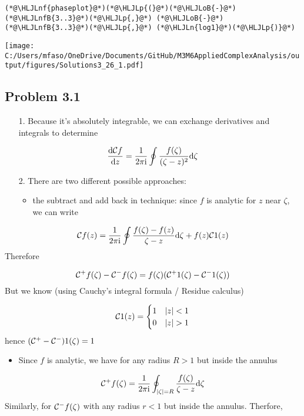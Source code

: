 \documentclass[12pt,landscape]{article}
\newcommand{\HLJLn}[1]{#1}
\newcommand{\HLJLnf}[1]{\textcolor[RGB]{66,102,213}{#1}}
\newcommand{\HLJLnfB}[1]{\textcolor[RGB]{59,151,46}{#1}}
\newcommand{\HLJLoB}[1]{\textcolor[RGB]{102,102,102}{\textbf{#1}}}
\newcommand{\HLJLp}[1]{#1}
\def\D{ {\rm d} }
\def\I{ {\rm i} }
\def\CC{ {\cal C} }
\begin{document}
{\begin{lstlisting}
(*@\HLJLnf{phaseplot}@*)(*@\HLJLp{(}@*)(*@\HLJLoB{-}@*)(*@\HLJLnfB{3..3}@*)(*@\HLJLp{,}@*) (*@\HLJLoB{-}@*)(*@\HLJLnfB{3..3}@*)(*@\HLJLp{,}@*) (*@\HLJLn{log1}@*)(*@\HLJLp{)}@*)
\end{lstlisting}

\texttt{[image: C:/Users/mfaso/OneDrive/Documents/GitHub/M3M6AppliedComplexAnalysis/output/figures/Solutions3\_26\_1.pdf]}

\subsection{Problem 3.1}
\begin{itemize}
\item[1. ] Because it's absolutely integrable, we can exchange derivatives and integrals to determine

\end{itemize}
\[
{\D \CC f \over \D z} = {1 \over 2 \pi \I} \oint {f(\zeta)\over (\zeta-z)^2} \D \zeta
\]
\begin{itemize}
\item[2. ] There are two different possible approaches:

\begin{itemize}
\item the subtract and add back in technique: since $f$ is analytic for $z$ near $\zeta$, we can write

\end{itemize}
\end{itemize}
\[
\CC f(z) = {1 \over 2 \pi \I} \oint {f(\zeta)-f(z) \over \zeta-z} \D \zeta + f(z) \CC 1(z)
\]
Therefore

\[
\CC^+ f(\zeta) - \CC^- f(\zeta) = f(\zeta)( \CC^+ 1(\zeta) - \CC^- 1(\zeta))
\]
But we know (using Cauchy's integral formula / Residue calculus)

\[
\CC 1(z) = \begin{cases} 1 & |z| < 1 \\
                            0 & |z| > 1
                            \end{cases}
\]
hence $(\CC^+-\CC^-)1(\zeta) = 1$

\begin{itemize}
\item Since $f$ is analytic, we have for any radius $R > 1$ but inside the annulus

\end{itemize}
\[
\CC^+ f(\zeta) = {1 \over 2 \pi \I} \oint_{|\zeta| = R} {f(\zeta) \over \zeta -z} \D\zeta
\]
Similarly, for $\CC^-f(\zeta)$ with any radius $r < 1$ but inside the annulus. Therfore,

}
\end{document}
